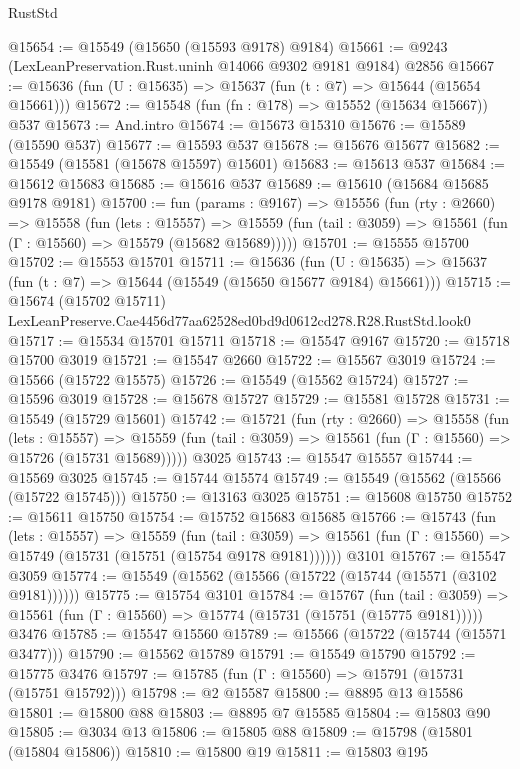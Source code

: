 \begin{lexlean}{RustStd}
\begin{coremodule}
@15654 := @15549 (@15650 (@15593 @9178) @9184)
@15661 := @9243 (LexLeanPreservation.Rust.uninh @14066 @9302 @9181 @9184) @2856
@15667 := @15636 (fun (U : @15635) => @15637 (fun (t : @7) => @15644 (@15654 @15661)))
@15672 := @15548 (fun (fn : @178) => @15552 (@15634 @15667)) @537
@15673 := And.intro
@15674 := @15673 @15310
@15676 := @15589 (@15590 @537)
@15677 := @15593 @537
@15678 := @15676 @15677
@15682 := @15549 (@15581 (@15678 @15597) @15601)
@15683 := @15613 @537
@15684 := @15612 @15683
@15685 := @15616 @537
@15689 := @15610 (@15684 @15685 @9178 @9181)
@15700 := fun (params : @9167) =>
  @15556
    (fun (rty : @2660) =>
    @15558
      (fun (lets : @15557) =>
      @15559 (fun (tail : @3059) => @15561 (fun (Γ : @15560) => @15579 (@15682 @15689)))))
@15701 := @15555 @15700
@15702 := @15553 @15701
@15711 := @15636
    (fun (U : @15635) => @15637 (fun (t : @7) => @15644 (@15549 (@15650 @15677 @9184) @15661)))
@15715 := @15674 (@15702 @15711) LexLeanPreserve.Cae4456d77aa62528ed0bd9d0612cd278.R28.RustStd.look0
@15717 := @15534 @15701 @15711
@15718 := @15547 @9167
@15720 := @15718 @15700 @3019
@15721 := @15547 @2660
@15722 := @15567 @3019
@15724 := @15566 (@15722 @15575)
@15726 := @15549 (@15562 @15724)
@15727 := @15596 @3019
@15728 := @15678 @15727
@15729 := @15581 @15728
@15731 := @15549 (@15729 @15601)
@15742 := @15721
    (fun (rty : @2660) =>
    @15558
      (fun (lets : @15557) =>
      @15559 (fun (tail : @3059) => @15561 (fun (Γ : @15560) => @15726 (@15731 @15689)))))
    @3025
@15743 := @15547 @15557
@15744 := @15569 @3025
@15745 := @15744 @15574
@15749 := @15549 (@15562 (@15566 (@15722 @15745)))
@15750 := @13163 @3025
@15751 := @15608 @15750
@15752 := @15611 @15750
@15754 := @15752 @15683 @15685
@15766 := @15743
    (fun (lets : @15557) =>
    @15559
      (fun (tail : @3059) =>
      @15561 (fun (Γ : @15560) => @15749 (@15731 (@15751 (@15754 @9178 @9181))))))
    @3101
@15767 := @15547 @3059
@15774 := @15549 (@15562 (@15566 (@15722 (@15744 (@15571 (@3102 @9181))))))
@15775 := @15754 @3101
@15784 := @15767
    (fun (tail : @3059) => @15561 (fun (Γ : @15560) => @15774 (@15731 (@15751 (@15775 @9181)))))
    @3476
@15785 := @15547 @15560
@15789 := @15566 (@15722 (@15744 (@15571 @3477)))
@15790 := @15562 @15789
@15791 := @15549 @15790
@15792 := @15775 @3476
@15797 := @15785 (fun (Γ : @15560) => @15791 (@15731 (@15751 @15792)))
@15798 := @2 @15587
@15800 := @8895 @13 @15586
@15801 := @15800 @88
@15803 := @8895 @7 @15585
@15804 := @15803 @90
@15805 := @3034 @13
@15806 := @15805 @88
@15809 := @15798 (@15801 (@15804 @15806))
@15810 := @15800 @19
@15811 := @15803 @195

\end{coremodule}
\end{lexlean}
